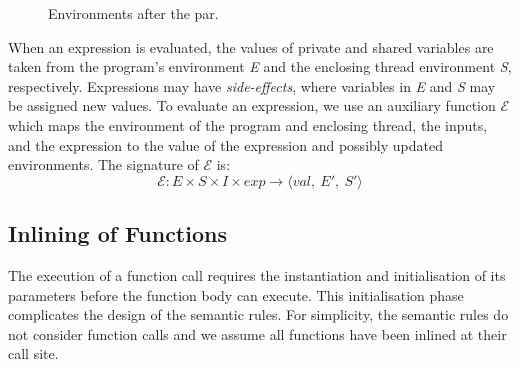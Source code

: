 \begin{figure}[t]
	\centering
	\hspace{1cm}
	
	\caption{Environments after the par.}
	\label{fig:shared_after_par}
\end{figure}

When an expression is evaluated, the values of private and shared 
variables are taken from the program's environment \emph{E} and 
the enclosing thread environment \emph{S}, respectively. Expressions
may have \emph{side-effects}, where variables in \emph{E} and \emph{S} 
may be assigned new values. To evaluate an expression, we use an auxiliary 
function $\mathcal{E}$ which maps the environment of the program and 
enclosing thread, the inputs, and the expression to the value of the 
expression and possibly updated environments. The signature of $\mathcal{E}$ is:
\begin{equation*}
		\mathcal{E}: E \times S \times I \times exp \to \langle val,~E',~S' \rangle
\end{equation*}



\subsection{Inlining of Functions}
The execution of a function call requires the instantiation and 
initialisation of its parameters before the function body can 
execute. This initialisation phase complicates the design of the
semantic rules. For simplicity, the semantic rules do not consider 
function calls and we assume all functions have been inlined at 
their call site.

